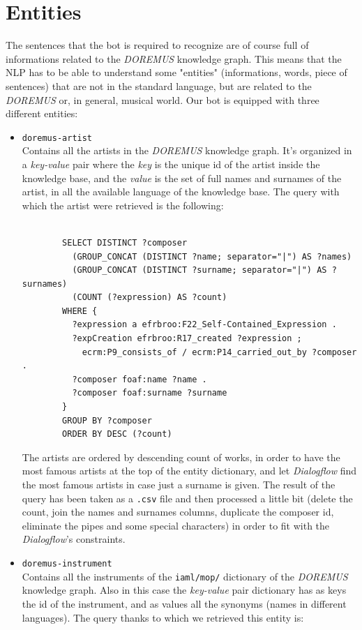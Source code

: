 \documentclass[a4paper,12pt]{report}
\begin{document}
	\section{Entities}
	The sentences that the bot is required to recognize are of course full of informations related to the \textit{DOREMUS} knowledge graph. This means that the NLP has to be able to understand some "entities" (informations, words, piece of sentences) that are not in the standard language, but are related to the \textit{DOREMUS} or, in general, musical world. Our bot is equipped with three different entities:
	\begin{itemize}
		\item \texttt{doremus-artist}\\
		Contains all the artists in the \textit{DOREMUS} knowledge graph. It's organized in a \textit{key-value} pair where the \textit{key} is the unique id of the artist inside the knowledge base, and the \textit{value} is the set of full names and surnames of the artist, in all the available language of the knowledge base.
		The query with which the artist were retrieved is the following:
		\begin{lstlisting}

		SELECT DISTINCT ?composer
		  (GROUP_CONCAT (DISTINCT ?name; separator="|") AS ?names)
		  (GROUP_CONCAT (DISTINCT ?surname; separator="|") AS ?surnames)
		  (COUNT (?expression) AS ?count)
		WHERE {
		  ?expression a efrbroo:F22_Self-Contained_Expression .
		  ?expCreation efrbroo:R17_created ?expression ;
		    ecrm:P9_consists_of / ecrm:P14_carried_out_by ?composer .
		  ?composer foaf:name ?name .
		  ?composer foaf:surname ?surname 
		}
		GROUP BY ?composer
		ORDER BY DESC (?count)
		\end{lstlisting}
		The artists are ordered by descending count of works, in order to have the most famous artists at the top of the entity dictionary, and let \textit{Dialogflow} find the most famous artists in case just a surname is given. The result of the query has been taken as a \texttt{.csv} file and then processed a little bit (delete the count, join the names and surnames columns, duplicate the composer id, eliminate the pipes and some special characters) in order to fit with the \textit{Dialogflow}'s constraints.
		
		\item \texttt{doremus-instrument}\\
		Contains all the instruments of the \texttt{iaml/mop/} dictionary of the \textit{DOREMUS} knowledge graph. Also in this case the \textit{key-value} pair dictionary has as keys the id of the instrument, and as values all the synonyms (names in different languages). The query thanks to which we retrieved this entity is:
		\begin{lstlisting}
		

\end{lstlisting}
\end{itemize}
\end{document}

